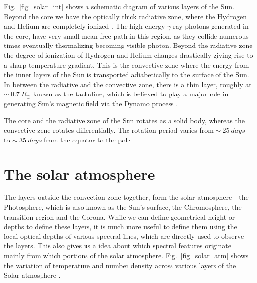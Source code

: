 Fig.~\ref{fig_solar_int} shows a schematic diagram of various layers of the Sun. Beyond the core we have the optically thick radiative zone, where the Hydrogen and Helium are completely ionized . The high energy $\gamma$-ray photons generated in the core, have very small mean free path in this region, as they collide numerous times eventually thermalizing becoming visible photon. Beyond the radiative zone the degree of ionization of Hydrogen and Helium changes drastically giving rise to a sharp temperature gradient. This is the convective zone where the energy from the inner layers of the Sun is transported adiabetically to the surface of the Sun. In between the radiative and the convective zone, there is a thin layer, roughly at $\sim~0.7~R_{\odot}$ known as the tacholine, which is believed to play a major role in generating Sun's magnetic field via the Dynamo process . 

The core and the radiative zone of the Sun rotates as a solid body, whereas the convective zone rotates differentially. The rotation period varies from $\sim~25~days$ to $\sim~35~days$ from the equator to the pole.

\section{The solar atmosphere}\label{solar_atmos}

The layers outside the convection zone together, form the solar atmosphere - the Photosphere, which is also known as the Sun's surface, the Chromosphere, the transition region and the Corona. While we can define geometrical height or depths to define these layers, it is much more useful to define them using the local optical depths of various spectral lines, which are directly used to observe the layers. This also gives us a idea about which spectral features originate mainly from which portions of the solar atmosphere. Fig.~\ref{fig_solar_atm} shows the variation of temperature and number density across various layers of the Solar atmosphere .

